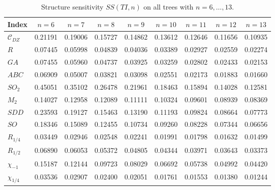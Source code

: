 \documentclass[11pt,a4paper]{article}
\theoremstyle{plain}
\theoremstyle{definition}
\theoremstyle{remark}
\newcommand{\CDZ}{\mathcal{C}_{DZ}}
\begin{document}
\begin{table}[htbp]
\centering
\small
\setlength{\tabcolsep}{4pt}
\caption{Structure sensitivity $SS(TI,n)$ on all trees with $n=6,\dots,13$.}
\label{tab:ss}
\begin{tabular}{lcccccccc}
\toprule
Index & $n{=}6$ & $n{=}7$ & $n{=}8$ & $n{=}9$ & $n{=}10$ & $n{=}11$ & $n{=}12$ & $n{=}13$ \\
\midrule
$\CDZ$       & 0.21191 & 0.19006 & 0.15727 & 0.14862 & 0.13612 & 0.12646 & 0.11656 & 0.10935 \\
$R$          & 0.07445 & 0.05998 & 0.04839 & 0.04036 & 0.03389 & 0.02927 & 0.02559 & 0.02274 \\
$GA$         & 0.07455 & 0.05960 & 0.04737 & 0.03925 & 0.03259 & 0.02802 & 0.02433 & 0.02153 \\
$ABC$        & 0.06909 & 0.05007 & 0.03821 & 0.03098 & 0.02551 & 0.02173 & 0.01883 & 0.01660 \\
$SO_2$       & 0.45051 & 0.35102 & 0.26478 & 0.21961 & 0.18463 & 0.15894 & 0.14028 & 0.12581 \\
$M_2$        & 0.14027 & 0.12958 & 0.12089 & 0.11111 & 0.10324 & 0.09601 & 0.08939 & 0.08369 \\
$SDD$        & 0.23593 & 0.19127 & 0.15463 & 0.13190 & 0.11193 & 0.09824 & 0.08664 & 0.07773 \\
$SO$         & 0.18346 & 0.15089 & 0.12455 & 0.10734 & 0.09260 & 0.08228 & 0.07344 & 0.06656 \\
$R_{1/4}$    & 0.03449 & 0.02946 & 0.02548 & 0.02241 & 0.01991 & 0.01798 & 0.01632 & 0.01499 \\
$R_{1/2}$    & 0.06890 & 0.06053 & 0.05372 & 0.04805 & 0.04344 & 0.03971 & 0.03643 & 0.03373 \\
$\chi_{-1}$  & 0.15187 & 0.12144 & 0.09723 & 0.08029 & 0.06692 & 0.05738 & 0.04992 & 0.04420 \\
$\chi_{1/4}$ & 0.03536 & 0.02907 & 0.02400 & 0.02051 & 0.01761 & 0.01553 & 0.01380 & 0.01244 \\
\bottomrule
\end{tabular}
\end{table}
\end{document}
